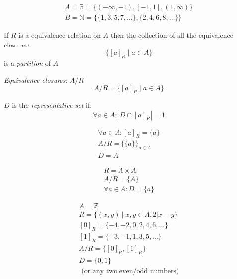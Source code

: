 \documentclass[00_complete]{subfiles}
\begin{document}
\begin{example}
\begin{gather*}
    A = \mathbb{R} = \{(-\infty, -1), [-1,1], (1,\infty)\} \\
    B = \mathbb{N} = \{\{1,3,5,7,\ldots\},\{2,4,6,8,\ldots\}\}
\end{gather*}
\end{example}

\begin{claim}
If $R$ is a equivalence relation on $A$ then the collection of all the
equivalence closures:
$$\{[a]_R \mid a \in A \}$$
is a \emph{partition} of $A$.
\end{claim}

\begin{symbols}
\emph{Equivalence closures}: $A/R$
$$A/R  = \{[a]_R \mid a \in A\}$$

$D$ is the \emph{representative set} if:
$$\forall a \in A: |D \cap [a]_R| = 1$$
\end{symbols}

\begin{example}
\begin{gather*}
    \forall a \in A: [a]_R = \{a\} \\
    A/R=\{\{a\}\}_{a \in A} \\
    D=A
\end{gather*}
\end{example}
\begin{example}
\begin{gather*}
    R = A \times A \\
    A/R = \{A\} \\
    \forall a \in A: D = \{a\}
\end{gather*}
\end{example}
\begin{example}
\begin{gather*}
    A  = \mathbb{Z} \\
    R = \{(x,y) \mid x,y \in A, 2 | x-y \} \\
    [0]_R = \{-4,-2,0,2,4,6,\ldots\} \\
    [1]_R = \{-3,-1,1,3,5,\ldots\} \\
    A/R = \{[0]_R, [1]_R \} \\
    D = \{0,1\} \\
    \text{ (or any two even/odd numbers)}
\end{gather*}
\end{example}
\end{document}
